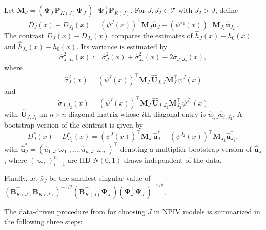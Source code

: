 \documentclass[
]{jss}
\begin{document}
Let
\(\mathbf M_J = (\mathbf \Psi_J^\top \mathbf P_{K(J)}^{\phantom \top} \mathbf \Psi_J^{\phantom \top} )^{-} \mathbf \Psi_J^\top \mathbf P_{K(J)}^{\phantom \top}\).
For \(J,J_2 \in \mathcal T\) with \(J_2 > J\), define \[
D_{J}(x)-D_{J_2}(x) = (\psi^J(x))^\top \mathbf M_J \hat{\mathbf  u}_J - (\psi^{J_2}(x))^\top \mathbf M_{J_2} \hat{\mathbf u}_{J_2} \,.
\] The contrast \(D_{J}(x)-D_{J_2}(x)\) compares the estimates of
\(\hat h_J(x) - h_0(x)\) and \(\hat h_{J_2}(x) - h_0(x)\). Its variance
is estimated by \[
 \hat \sigma_{J,J_2}^2(x) := \hat \sigma_{J}^2(x) + \hat \sigma_{J_2}^2(x) - 2 \tilde \sigma_{J,J_2}(x),
\] where \[
 \hat \sigma_{J}^2(x) =  (\psi^J(x))^\top \mathbf M_J^{\phantom \top} \widehat{\mathbf U}_{J,J}^{\phantom \top} \mathbf M_J^\top \psi^J(x)
\] and \[
 \tilde \sigma_{J,J_2}(x)  = (\psi^J(x))^\top \mathbf M_J^{\phantom \top} \widehat{\mathbf U}_{J,J_2}^{\phantom \top} \mathbf M_{J_2}^\top \psi^{J_2}(x)
\] with \(\widehat{\mathbf U}_{J,J_2}\) an \(n\times n\) diagonal matrix
whose \(i\)th diagonal entry is \(\hat u_{i,J} \hat u_{i,J_2}\). A
bootstrap version of the contrast is given by \[
D_{J}^*(x)-D_{J_2}^*(x) = (\psi^J(x))^\top\mathbf M_J^{\phantom \top}  \hat{\mathbf u}_J^* - (\psi^{J_2}(x))^\top \mathbf M_{J_2}^{\phantom \top} \hat{\mathbf u}_{J_2}^*,
\] with
\(\hat{\mathbf u}_J^* = (\hat u_{1,J}\varpi_1,\ldots,\hat u_{n,J}\varpi_n)^\top\)
denoting a multiplier bootstrap version of \(\hat{\mathbf u}_J\), where
\((\varpi_i)_{i=1}^n\) are IID \(N(0,1)\) draws independent of the data.

Finally, let \(\hat s_J\) be the smallest singular value of
\((\mathbf B_{K(J)}^\top\mathbf B_{K(J)}^{\phantom \top})^{-1/2} (\mathbf B_{K(J)}^\top \mathbf \Psi_J^{\phantom \top}) (\mathbf \Psi_J^\top \mathbf \Psi_J^{\phantom \top})^{-1/2}\).

The data-driven procedure from \citet{CCK} for choosing \(J\) in NPIV
models is summarized in the following three steps:
\end{document}
